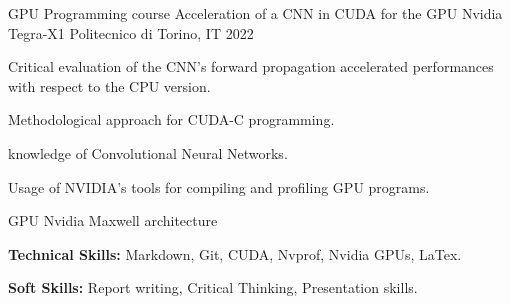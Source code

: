 \begin{cventries}
  \cventry
    {GPU Programming course} %
    {Acceleration of a CNN in CUDA for the GPU Nvidia Tegra-X1} %
    {Politecnico di Torino, IT} %
    {2022} %
    {
      \begin{cvitems} %
        \item {Critical evaluation of the CNN's forward propagation accelerated performances with respect to the CPU version.}
        \item {Methodological approach for CUDA-C programming.}
        \item {knowledge of Convolutional Neural Networks.}
        \item {Usage of NVIDIA's tools for compiling and profiling GPU programs.}
        \item {GPU Nvidia Maxwell architecture}
        \item {\textbf{Technical Skills:} Markdown, Git, CUDA, Nvprof, Nvidia GPUs, LaTex.}
        \item {\textbf{Soft Skills:} Report writing, Critical Thinking, Presentation skills.}
      \end{cvitems}
    }
\end{cventries}

